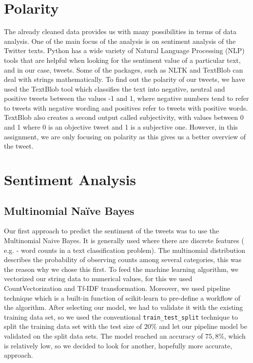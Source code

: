 \documentclass{article}
\begin{document}
  \section{Polarity}
  \indent The already cleaned data provides us with many possibilities in
  terms of data analysis. One of the main focus of the analysis is on
  sentiment analysis of the Twitter texts. Python has a wide variety
  of Natural Language Processing (NLP) tools that are helpful when
  looking for the sentiment value of a particular text, and in our
  case, tweets. Some of the packages, such as NLTK and TextBlob can
  deal with strings mathematically. To find out the polarity of our
  tweets, we have used the TextBlob tool which classifies the text
  into negative, neutral and positive tweets between the values -1 and
  1, where negative numbers tend to refer to tweets with negative
  wording and positives refer to tweets with positive words. TextBlob
  also creates a second output called subjectivity, with values
  between 0 and 1  where 0 is an objective tweet and 1 is a subjective
  one. However, in this assignment, we are only focusing on polarity
  as this gives us a better overview of the tweet.  
  
  \section{Sentiment Analysis}
  \subsection{Multinomial Naïve Bayes}
  \indent Our first approach to predict the sentiment of the tweets was to use
  the Multinomial Naive Bayes. It is generally used where there are
  discrete features ( e.g. - word counts in a text classification
  problem). The multinomial distribution describes the probability of
  observing counts among several categories, this was the reason why
  we chose this first. To feed the machine learning algorithm, we
  vectorized our string data to numerical values, for this  we used
  CountVectorization and Tf-IDF transformation. Moreover, we used
  pipeline technique which is a built-in function of scikit-learn to
  pre-define a workflow of the algorithm. After selecting our model,
  we had to validate it with the existing training data set, so we
  used the conventional \texttt{train\_test\_split} technique to split the
  training data set with the test size of $20\%$ and let our pipeline
  model be validated on the split data sets. The model reached an
  accuracy of $75,8\%$, which is relatively low, so we decided to look
  for another, hopefully more accurate, approach.
  
\end{document}
